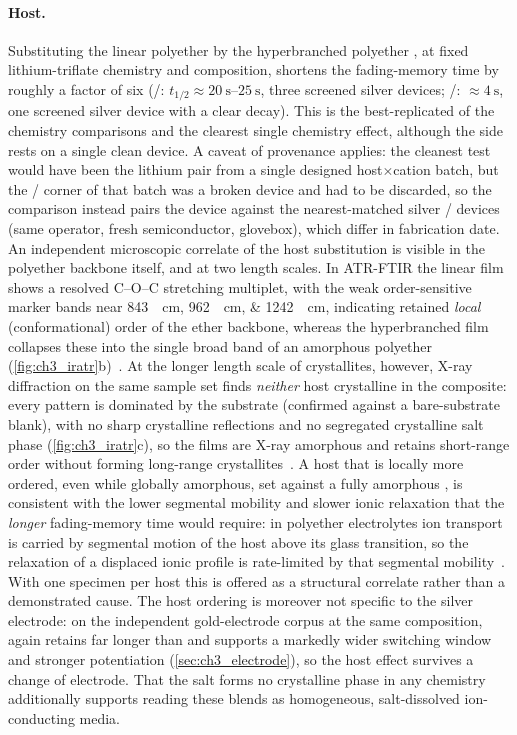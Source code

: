 \documentclass[12pt, twoside]{report}
\begin{document}
\paragraph{Host.} Substituting the linear polyether \PEO{} by the hyperbranched polyether \TMPE{}, at fixed lithium-triflate chemistry and composition, shortens the fading-memory time by roughly a factor of six (\PEO{}/\LiTf{}: \(t_{1/2}\approx\SIrange{20}{25}{\second}\), three screened silver devices; \TMPE{}/\LiTf{}: \(\approx\SI{4}{\second}\), one screened silver device with a clear decay). This is the best-replicated of the chemistry comparisons and the clearest single chemistry effect, although the \TMPE{} side rests on a single clean device. A caveat of provenance applies: the cleanest test would have been the lithium pair from a single designed host$\times$cation batch, but the \PEO{}/\LiTf{} corner of that batch was a broken device and had to be discarded, so the comparison instead pairs the \TMPE{} device against the nearest-matched silver \PEO{}/\LiTf{} devices (same operator, fresh semiconductor, glovebox), which differ in fabrication date. An independent microscopic correlate of the host substitution is visible in the polyether backbone itself, and at two length scales. In ATR-FTIR the linear \PEO{} film shows a resolved C--O--C stretching multiplet, with the weak order-sensitive marker bands near \SIlist{843;962;1242}{\per\centi\meter}, indicating retained \emph{local} (conformational) order of the ether backbone, whereas the hyperbranched \TMPE{} film collapses these into the single broad band of an amorphous polyether (\cref{fig:ch3_iratr}b)~\cite{Frech1999PEOLiTf}. At the longer length scale of crystallites, however, X-ray diffraction on the same sample set finds \emph{neither} host crystalline in the composite: every pattern is dominated by the \ITO{} substrate (confirmed against a bare-substrate blank), with no sharp \PEO{} crystalline reflections and no segregated crystalline salt phase (\cref{fig:ch3_iratr}c), so the films are X-ray amorphous and \PEO{} retains short-range order without forming long-range crystallites~\cite{Lightfoot1993,Frech1999PEOLiTf}. A host that is locally more ordered, even while globally amorphous, set against a fully amorphous \TMPE{}, is consistent with the lower segmental mobility and slower ionic relaxation that the \emph{longer} \PEO{} fading-memory time would require: in polyether electrolytes ion transport is carried by segmental motion of the host above its glass transition, so the relaxation of a displaced ionic profile is rate-limited by that segmental mobility~\cite{Armand1989,RatnerShriver1988,Druger1983}. With one specimen per host this is offered as a structural correlate rather than a demonstrated cause. The host ordering is moreover not specific to the silver electrode: on the independent gold-electrode corpus at the same composition, \PEO{} again retains far longer than \TMPE{} and supports a markedly wider switching window and stronger potentiation (\cref{sec:ch3_electrode}), so the host effect survives a change of electrode. That the salt forms no crystalline phase in any chemistry additionally supports reading these blends as homogeneous, salt-dissolved ion-conducting media.
\end{document}
